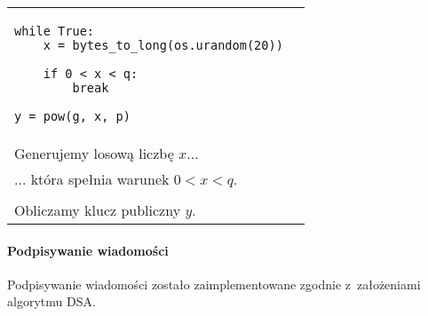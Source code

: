 \documentclass{article}
\begin{document}
        \noindent\begin{table}[ht!]
            \begin{tabular}{lr}
                \begin{minipage}[t]{0.45\textwidth}
                    \begin{verbatim}
while True:
    x = bytes_to_long(os.urandom(20))

    if 0 < x < q:
        break

y = pow(g, x, p)
                    \end{verbatim}
                \end{minipage}
                
                &
        
                \begin{minipage}[t]{0.45\textwidth}                    
                    \noindent \\ Generujemy losową liczbę $x$... \\
                    
                    \noindent ... która spełnia warunek $0 < x < q$. \\ \\
                    
                    \noindent Obliczamy klucz publiczny $y$.
                \end{minipage}
            
                \\
            
            \end{tabular}
        \end{table}
        
        \paragraph{Podpisywanie wiadomości} Podpisywanie wiadomości zostało zaimplementowane zgodnie z~założeniami algorytmu DSA.
        
\end{document}
